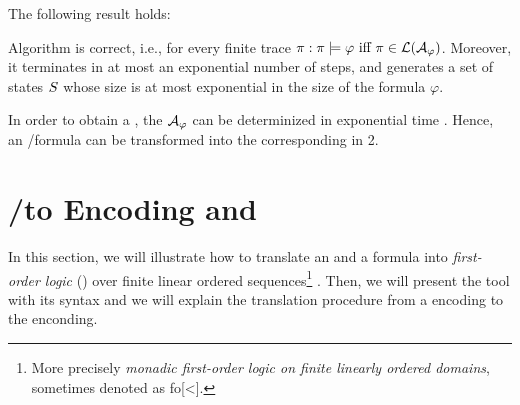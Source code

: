 The following result holds:
\begin{theorem}\label{ldlf2nfa-correctness}
Algorithm \LTLfToNFA is correct, i.e., for every finite trace $\pi: \pi \models \varphi \ \text{iff}\  \pi \in \mathcal{L}(\mathcal{A}_\varphi)$. Moreover, it terminates in at most an exponential number of steps, and generates a set of states $S$ whose size is at most exponential in the size of the formula $\varphi$.
\end{theorem}

In order to obtain a \DFA, the \NFA $\mathcal{A}_\varphi$ can be determinized in exponential time \citep{Rabin:1959:FAD:1661907.1661909}. Hence, an \LTLf/\PLTL formula can be transformed into the corresponding \DFA in 2\EXPTIME.

\section{\LTLf/\PLTL to \FOL Encoding and \MONA}\label{sec:mona-encoding}
In this section, we will illustrate how to translate an \LTLf and a \PLTL formula into \emph{first-order logic} (\FOL) over finite linear ordered sequences\footnote{More precisely \textit{monadic first-order logic on finite linearly ordered domains}, sometimes denoted as \sc fo[<].} \citep{de2013linear,zpv2018}. Then, we will present the \MONA tool with its syntax and we will explain the translation procedure from a \FOL encoding to the \MONA enconding.
